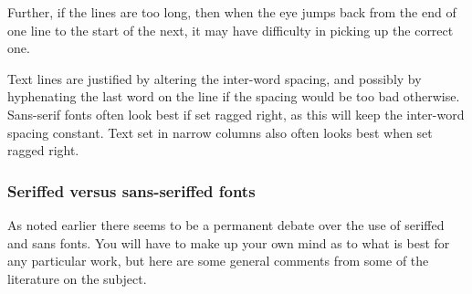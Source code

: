 \documentclass[10pt,letterpaper]{memoir}
\begin{document}
\begin{enumerate}
    Further, if the lines are too long, then when the eye jumps back from
the end of one line to the start of the next, it may have difficulty in 
picking up the correct one.

    Text lines are justified by altering the inter-word spacing, and possibly
by hyphenating the last word on the line if the spacing would be too bad
otherwise. Sans-serif fonts often look best if set ragged right, as this will
keep the inter-word spacing constant. Text set in narrow columns also often
looks best when set ragged right.


\end{enumerate}

\subsubsection{Seriffed versus sans-seriffed fonts}

    As noted earlier there seems to be a permanent debate over the use
of seriffed and sans fonts. You will have to make up your own mind as
to what is best for any particular work, but here are some general
comments from some of the literature on the subject.
\end{document}
